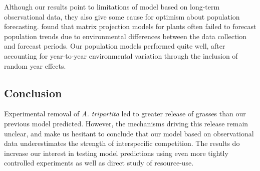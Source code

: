 \documentclass[11pt]{article}
\begin{document}
\begin{doublespacing}
Although our results point to limitations of model based on long-term observational data, they also give some cause for optimism about population forecasting. \citet{Crone2013} found that matrix projection models for plants often failed to forecast population trends due 
to environmental differences between the data collection and forecast periods. Our population models 
performed quite well, after accounting for year-to-year environmental variation through the inclusion of
random year effects. 

\subsection*{Conclusion}

Experimental removal of \textit{A. tripartita} led to greater release of grasses than our previous model predicted. However, the mechanisms driving this  release remain unclear, and make us hesitant to conclude that our model based on observational data underestimates the strength of interspecific competition. The results do increase our interest in testing model predictions using even more tightly controlled experiments as well as direct study of resource-use.


\end{doublespacing}
\end{document}
